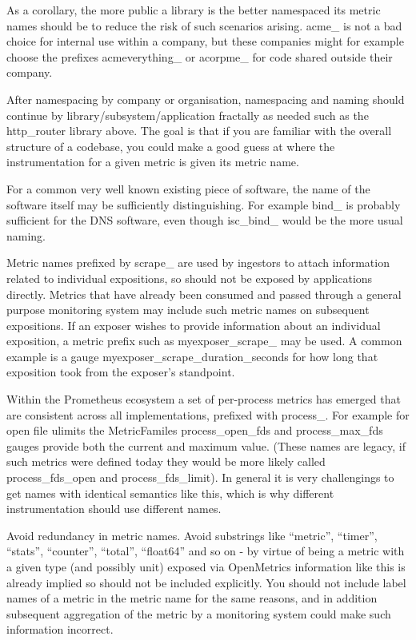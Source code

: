 \documentclass[a4paper,12pt,notitlepage,twoside,openright]{article}
\begin{document}
As a corollary, the more public a library is the better namespaced its
metric names should be to reduce the risk of such scenarios arising.
acme\_ is not a bad choice for internal use within a company, but these
companies might for example choose the prefixes acmeverything\_ or
acorpme\_ for code shared outside their company.

After namespacing by company or organisation, namespacing and naming
should continue by library/subsystem/application fractally as needed
such as the http\_router library above. The goal is that if you are
familiar with the overall structure of a codebase, you could make a good
guess at where the instrumentation for a given metric is given its
metric name.

For a common very well known existing piece of software, the name of the
software itself may be sufficiently distinguishing. For example bind\_
is probably sufficient for the DNS software, even though isc\_bind\_
would be the more usual naming.

Metric names prefixed by scrape\_ are used by ingestors to attach
information related to individual expositions, so should not be exposed
by applications directly. Metrics that have already been consumed and
passed through a general purpose monitoring system may include such
metric names on subsequent expositions. If an exposer wishes to provide
information about an individual exposition, a metric prefix such as
myexposer\_scrape\_ may be used. A common example is a gauge
myexposer\_scrape\_duration\_seconds for how long that exposition took
from the exposer's standpoint.

Within the Prometheus ecosystem a set of per-process metrics has emerged
that are consistent across all implementations, prefixed with process\_.
For example for open file ulimits the MetricFamiles process\_open\_fds
and process\_max\_fds gauges provide both the current and maximum value.
(These names are legacy, if such metrics were defined today they would
be more likely called process\_fds\_open and process\_fds\_limit). In
general it is very challengings to get names with identical semantics
like this, which is why different instrumentation should use different
names.

Avoid redundancy in metric names. Avoid substrings like ``metric'',
``timer'', ``stats'', ``counter'', ``total'', ``float64'' and so on - by
virtue of being a metric with a given type (and possibly unit) exposed
via OpenMetrics information like this is already implied so should not
be included explicitly. You should not include label names of a metric
in the metric name for the same reasons, and in addition subsequent
aggregation of the metric by a monitoring system could make such
information incorrect.
\end{document}
